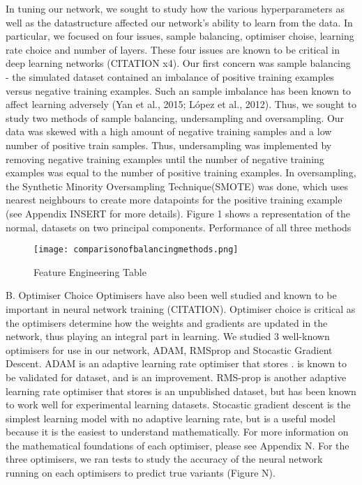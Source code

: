 \documentclass{article}
\begin{document}
In tuning our network, we sought to study how the various hyperparameters as well as the datastructure affected our network's ability to learn from the data. In particular, we focused on four issues, sample balancing, optimiser choise, learning rate choice and number of layers. These four issues are known to be critical in deep learning networks (CITATION x4). Our first concern was sample balancing - the simulated dataset contained an imbalance of positive training examples versus negative training examples. Such an sample imbalance has been known to affect learning adversely (Yan et al., 2015; López et al., 2012). Thus, we sought to study two methods of sample balancing, undersampling and oversampling. Our data was skewed with a high amount of negative training samples and  a low number of positive train samples. Thus, undersampling was implemented by removing negative training examples until the number of negative training examples was equal to the number of positive training examples. In oversampling, the Synthetic Minority Oversampling Technique(SMOTE) was done, which uses nearest neighbours to create more datapoints for the positive training example (see Appendix INSERT for more details). Figure 1 shows a representation of the normal, datasets on two principal components. Performance of all three methods 	


\begin{figure}[H]
\caption{Feature Engineering Table}
\texttt{[image: comparisonofbalancingmethods.png]}
\centering
\end{figure}

B. Optimiser Choice
Optimisers have also been well studied and known to be important in neural network training (CITATION). Optimiser choice is critical as the optimisers determine how the weights and gradients are updated in the network, thus playing an integral part in learning. We studied 3 well-known optimisers for use in our network, ADAM, RMSprop and Stocastic Gradient Descent. ADAM is an adaptive learning rate optimiser that stores . is known to be validated for dataset, and is an improvement. RMS-prop is another adaptive learning rate optimiser that stores is an unpublished dataset, but has been known to work well for experimental learning datasets. Stocastic gradient descent is the simplest learning model with no adaptive learning rate, but is a useful model because it is the easiest to understand mathematically. For more information on the mathematical foundations of each optimiser, please see Appendix N. For the three optimisers, we ran tests to study the accuracy of the neural network running on each optimisers to predict true variants (Figure N).
\end{document}
